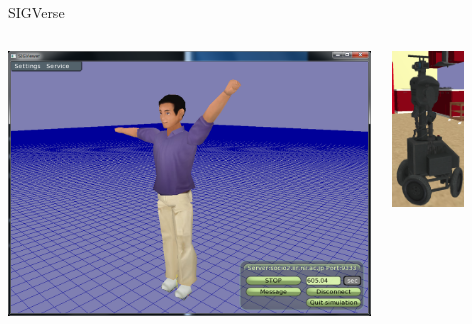 \documentclass[11pt]{beamer}
\begin{document}
\begin{frame}{SIGVerse}		
\begin{columns}[t]
	\begin{column}[T]{.6\textwidth}
		\includegraphics[width=1\textwidth]{images/manViewer.png}
	\end{column}
	\begin{column}[T]{.4\textwidth}
		\includegraphics[width=0.6\textwidth]{images/robot_000_sigverse.png}
	\end{column}
\end{columns}
\end{frame}
\end{document}
